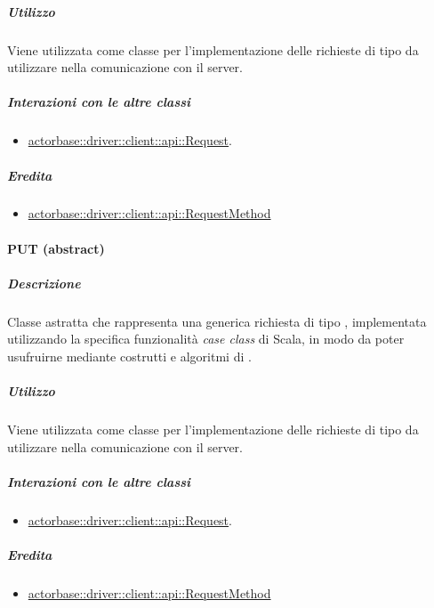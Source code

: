 \documentclass{scalatekids-article}
\begin{document}
\subparagraph{Utilizzo}

Viene utilizzata come classe per l'implementazione delle richieste 
di tipo  da utilizzare nella comunicazione con il server.

\subparagraph{Interazioni con le altre classi}

\begin{itemize}
\item \hyperref[sec:actorbase::driver::client::api::Request]{actorbase::driver::client::api::Request}.
\end{itemize}

\subparagraph{Eredita}

\begin{itemize}
\item \hyperref[sec:actorbase::driver::client::api::RequestMethod]{actorbase::driver::client::api::RequestMethod}
\end{itemize}


\paragraph{PUT (abstract)}
\label{sec:actorbase::driver::client::api::PUT}

\subparagraph{Descrizione}

Classe astratta che rappresenta una generica richiesta  di tipo
, implementata utilizzando la specifica funzionalità \textit{case
  class} di Scala, in modo da poter usufruirne mediante costrutti e algoritmi di
.

\subparagraph{Utilizzo}

Viene utilizzata come classe per l'implementazione delle richieste 
di tipo  da utilizzare nella comunicazione con il server.

\subparagraph{Interazioni con le altre classi}

\begin{itemize}
\item \hyperref[sec:actorbase::driver::client::api::Request]{actorbase::driver::client::api::Request}.
\end{itemize}

\subparagraph{Eredita}

\begin{itemize}
\item \hyperref[sec:actorbase::driver::client::api::RequestMethod]{actorbase::driver::client::api::RequestMethod}
\end{itemize}
\end{document}
